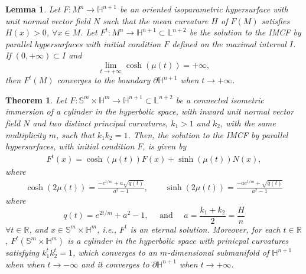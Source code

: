 \documentclass[10pt,a4paper]{amsart}
\newtheorem{lemma}{Lemma}
\newtheorem{theorem}{Theorem}
\newcommand{\R}{\mathbb{R}}
\begin{document}
\begin{lemma}\label{res.23}
Let $F:M^{n} \longrightarrow \mathbb{H}^{n+1}$ be an oriented isoparametric hypersurface with  unit normal vector field $N$ such that the mean curvature $H$ of $F(M)$ satisfies $H(x)>0$, $\forall x \in M$. Let ${F}^t:M^{n}  \longrightarrow \mathbb{H}^{n+1} \subset \mathbb{L}^{n+2}$ be the solution to the IMCF by parallel hypersurfaces with initial condition $F$ defined on the maximal interval $I$. If $(0,+\infty) \subset I$ and 
$$
\lim\limits_{t \longrightarrow +\infty}\cosh(\mu(t))=+\infty,
$$ 
then ${F}^{t}(M)$ converges to the boundary $\partial\mathbb{H}^{n+1}$ when $t \longrightarrow +\infty$.
\end{lemma}

\begin{theorem}\label{res.17}
	Let $F:\mathbb{S}^m \times \mathbb{H}^m \longrightarrow \mathbb{H}^{n+1} \subset \mathbb{L}^{n+2}$ be a connected  isometric immersion of a cylinder in the hyperbolic space, with 
	inward  
	unit normal vector field $N$ and two distinct principal curvatures, $k_{1}>1$ and $k_{2}$, with the same multiplicity $m$, such that $k_{1}k_{2}=1$. Then, the solution to the IMCF by parallel hypersurfaces, with initial condition $F$, is given by
	\begin{eqnarray}
	{F}^{t}(x)=\cosh(\mu(t))F(x)+\sinh(\mu(t))N(x), \nonumber
	\end{eqnarray}
	where
	\begin{eqnarray}\label{eq.p.104}
	\cosh (2\mu(t))=\frac{-e^{t/m}+a\sqrt{q(t)}} {a^2-1}, 
	\qquad 
	\sinh (2\mu(t))=\frac{-a e^{t/m}+\sqrt{q(t)}} {a^2-1}
	\end{eqnarray}
where
 $$q(t)= e^{2t/m}+ a^2-1, \quad \mbox{ and }\quad a=\frac{k_1+k_2}{2}= \frac{H}{n}$$ 
 $\forall t \in \R$, and $x\in \mathbb{S}^m \times \mathbb{H}^m$, i.e., ${F}^{t}$ is an eternal solution.
 Moreover, for each $t\in\R$,  ${F}^{t}(\mathbb{S}^{m}\times \mathbb{H}^{m})$ is a cylinder in the hyperbolic space with prinicpal curvatures satisfying $k_1^tk_2^t=1$, which converges to an $m$-dimensional submanifold of $\mathbb{H}^{n+1}$ when  
 when $t \rightarrow -\infty$ and it converges to  
  $\partial\mathbb{H}^{n+1}$ when $t \rightarrow +\infty$.
\end{theorem}
\end{document}
